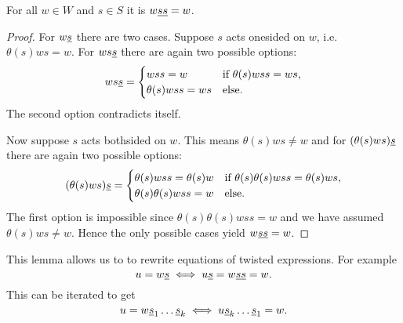 \begin{lemm}
	For all $w \in W$ and $s \in S$ it is $w \underline{ss} = w$.

	\begin{proof}
		For $w \underline{s}$ there are two cases. Suppose $s$ acts onesided on $w$, i.e. $\theta(s)ws = w$. For $ws \underline{s}$ there are again two possible options:
		$$ ws \underline{s} = \begin{cases}
			wss = w & \textrm{if } \theta(s)wss = ws, \\
			\theta(s)wss = ws & \textrm{else}. \\
		\end{cases} $$
		The second option contradicts itself.

		Now suppose $s$ acts bothsided on $w$. This means $\theta(s)ws \neq w$ and for $(\theta(s)ws) \underline{s}$ there are again two possible options:
		$$ (\theta(s)ws) \underline{s} = \begin{cases}
			\theta(s)wss = \theta(s)w & \textrm{if } \theta(s) \theta(s) w ss = \theta(s) w s, \\
			\theta(s)\theta(s)wss = w & \textrm{else}. \\
		\end{cases} $$
		The first option is impossible since $\theta(s) \theta(s) w ss = w$ and we have assumed $\theta(s)ws \neq w$. Hence the only possible cases yield $w \underline{s} \underline{s} = w$.
	\end{proof}
\end{lemm}

\begin{rema}
	This lemma allows us to to rewrite equations of twisted expressions. For example
	$$ u = w \underline{s} \iff u \underline{s} = w \underline{s} \underline{s} = w. $$
	This can be iterated to get
	$$ u = w \underline{s}_1 \ldots \underline{s}_k \iff u \underline{s}_k \ldots \underline{s}_1 = w. $$
\end{rema}

